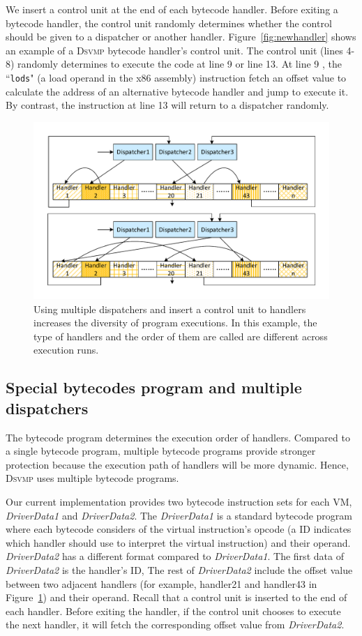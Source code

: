 \documentclass[preprint,12pt,3p]{elsarticle}
\newcommand{\DSVMP}{\textsc{Dsvmp }}
\begin{document}
We insert a control unit at the end of each bytecode handler. Before exiting a bytecode handler,
the control unit randomly determines whether the control should be given to a dispatcher or
another handler. Figure~\ref{fig:newhandler} shows an example of a \DSVMP bytecode handler's control unit.
The control unit (lines 4-8) randomly determines to execute the code at line 9 or line 13.
At line 9 , the ``\texttt{lods}" (a load operand in the x86 assembly) instruction fetch an offset value
to calculate the address of an alternative bytecode handler and jump to execute it.
By contrast, the instruction at line 13 will return to a dispatcher randomly.

\begin{figure}[!t]
  \centering
  \includegraphics[width=0.65\columnwidth]{figure/figdh.pdf}
  \caption{Using multiple dispatchers and insert a control unit to handlers increases the diversity of program executions. In this example, the type of handlers and the order of them are called are different across execution runs. }\label{fig:Fig.3}
\end{figure}

\subsection{Special bytecodes program and multiple dispatchers}\label{sec:mbd}
The bytecode program determines the execution order of handlers. Compared to a single bytecode program,
multiple bytecode programs provide stronger protection because the execution path of handlers will be more dynamic.
Hence, \DSVMP uses multiple bytecode programs.

Our current implementation provides two bytecode instruction sets for each VM,
\emph{DriverData1} and \emph{DriverData2}. The \emph{DriverData1} is a
standard bytecode program where each bytecode considers of the
virtual instruction's opcode (a ID indicates which handler should use to
interpret the virtual instruction) and their operand. \emph{DriverData2} has a different
format compared to \emph{DriverData1}. The first data of \emph{DriverData2}
is the handler's ID, The rest of \emph{DriverData2} include the
offset value between two adjacent handlers (for example, handler21 and handler43 in Figure~\ref{fig:Fig.3}) and their operand.
Recall that a control unit is inserted to the end of each handler. Before exiting the handler,
if the control unit chooses to execute the next handler, it will fetch the corresponding offset value from \emph{DriverData2}.
\end{document}
